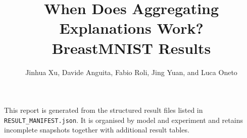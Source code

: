 \documentclass[10pt,a4paper]{article}
\title{When Does Aggregating Explanations Work?\\\large BreastMNIST Results}
\author{Jinhua Xu, Davide Anguita, Fabio Roli, Jing Yuan, and Luca Oneto}
\date{}
\begin{document}
\maketitle

\noindent
This report is generated from the structured result files listed in
\texttt{RESULT\_MANIFEST.json}. It is organised by model and experiment
and retains incomplete snapshots together with additional result tables.


\end{document}
